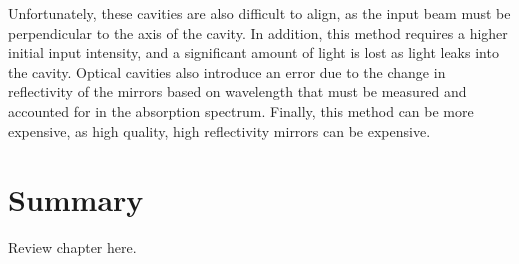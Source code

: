 Unfortunately, these cavities are also difficult to align, as the input beam
must be perpendicular to the axis of the cavity. In addition, this method
requires a higher initial input intensity, and a significant amount of light is
lost as light leaks into the cavity. Optical cavities also introduce an error
due to the change in reflectivity of the mirrors based on wavelength that must
be measured and accounted for in the absorption spectrum. Finally, this method can be more expensive, as
high quality, high reflectivity mirrors can be expensive.




\section{Summary}
Review chapter here.

